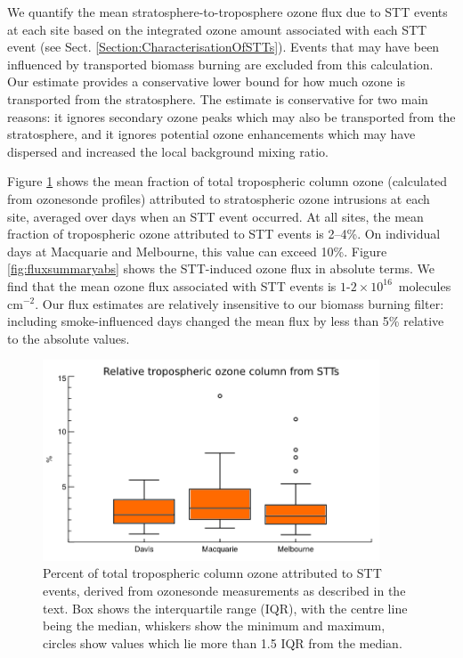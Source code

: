   We quantify the mean stratosphere-to-troposphere ozone flux due to STT events at each site based on the integrated ozone amount associated with each STT event (see Sect. \ref{Section:CharacterisationOfSTTs}).
  Events that may have been influenced by transported biomass burning are excluded from this calculation.
  Our estimate provides a conservative lower bound for how much ozone is transported from the stratosphere.
  The estimate is conservative for two main reasons: it ignores secondary ozone peaks which may also be transported from the stratosphere, and it ignores potential ozone enhancements which may have dispersed and increased the local background mixing ratio.
  
  Figure \ref{fig:fluxsummary} shows the mean fraction of total tropospheric column ozone (calculated from ozonesonde profiles) attributed to stratospheric ozone intrusions at each site, averaged over days when an STT event occurred.
  At all sites, the mean fraction of tropospheric ozone attributed to STT events is 2--4\%. On individual days at Macquarie and Melbourne, this value can exceed 10\%.
  Figure \ref{fig:fluxsummaryabs} shows the STT-induced ozone flux in absolute terms.
  We find that the mean ozone flux associated with STT events is $1$-$2 \times 10^{16}$~molecules cm$^{-2}$.
  Our flux estimates are relatively insensitive to our biomass burning filter: including smoke-influenced days changed the mean flux by less than 5\% relative to the absolute values.
  
  \begin{figure}[t]
    \includegraphics[width=10cm]{figures/flux_relative.png}
    \caption{%
      Percent of total tropospheric column ozone attributed to STT events, derived from ozonesonde measurements as described in the text.
      Box shows the interquartile range (IQR), with the centre line being the median, whiskers show the minimum and maximum, circles show values which lie more than 1.5 IQR from the median.}
    \label{fig:fluxsummary}
  \end{figure}
  

